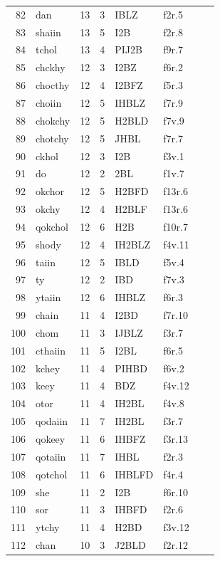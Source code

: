 \documentclass[11pt,a4paper]{article}
\begin{document}
\begin{landscape}
\begin{longtable}{@{}r>{\ttfamily}lrrl>{\ttfamily}l>{\raggedright\arraybackslash}p{80mm}>{\raggedright\arraybackslash}p{36mm}@{}}
82 & dan & 13 & 3 & IBLZ & f2r.5 &  & \\
83 & shaiin & 13 & 5 & I2B & f2r.8 &  & \\
84 & tchol & 13 & 4 & PIJ2B & f9r.7 &  & \\
85 & chckhy & 12 & 3 & I2BZ & f6r.2 &  & \\
86 & chocthy & 12 & 4 & I2BFZ & f5r.3 &  & \\
87 & choiin & 12 & 5 & IHBLZ & f7r.9 &  & \\
88 & chokchy & 12 & 5 & H2BLD & f7v.9 &  & \\
89 & chotchy & 12 & 5 & JHBL & f7r.7 &  & \\
90 & ckhol & 12 & 3 & I2B & f3v.1 &  & \\
91 & do & 12 & 2 & 2BL & f1v.7 &  & \\
92 & okchor & 12 & 5 & H2BFD & f13r.6 &  & \\
93 & okchy & 12 & 4 & H2BLF & f13r.6 &  & \\
94 & qokchol & 12 & 6 & H2B & f10r.7 &  & \\
95 & shody & 12 & 4 & IH2BLZ & f4v.11 &  & \\
96 & taiin & 12 & 5 & IBLD & f5v.4 &  & \\
97 & ty & 12 & 2 & IBD & f7v.3 &  & \\
98 & ytaiin & 12 & 6 & IHBLZ & f6r.3 &  & \\
99 & chain & 11 & 4 & I2BD & f7r.10 &  & \\
100 & chom & 11 & 3 & IJBLZ & f3r.7 &  & \\
101 & cthaiin & 11 & 5 & I2BL & f6r.5 &  & \\
102 & kchey & 11 & 4 & PIHBD & f6v.2 &  & \\
103 & keey & 11 & 4 & BDZ & f4v.12 &  & \\
104 & otor & 11 & 4 & IH2BL & f4v.8 &  & \\
105 & qodaiin & 11 & 7 & IH2BL & f3r.7 &  & \\
106 & qokeey & 11 & 6 & IHBFZ & f3r.13 &  & \\
107 & qotaiin & 11 & 7 & IHBL & f2r.3 &  & \\
108 & qotchol & 11 & 6 & IHBLFD & f4r.4 &  & \\
109 & she & 11 & 2 & I2B & f6r.10 &  & \\
110 & sor & 11 & 3 & IHBFD & f2r.6 &  & \\
111 & ytchy & 11 & 4 & H2BD & f3v.12 &  & \\
112 & chan & 10 & 3 & J2BLD & f2r.12 &  & \\

\end{longtable}
\end{landscape}
\end{document}

